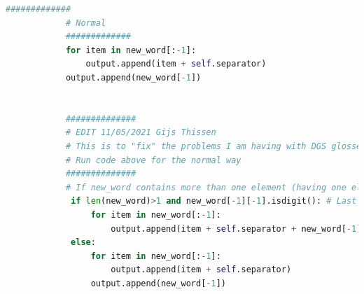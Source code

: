  \label{apx:bpemod}
\begin{lstlisting}[language=Python, caption=Shown is the Python code that is a modification to the normal Byte Pair Encoding algorithm.]
            #############
            # Normal
            #############
            for item in new_word[:-1]:
                output.append(item + self.separator)
            output.append(new_word[-1])


            ##############
            # EDIT 11/05/2021 Gijs Thissen
            # This is to "fix" the problems I am having with DGS glosses with features that get split up
            # Run code above for the normal way
            ##############
            # If new_word contains more than one element (having one element suggest there not being a temporal feature)
             if len(new_word)>1 and new_word[-1][-1].isdigit(): # Last element of last element of new_word is digit
                 for item in new_word[:-1]:
                     output.append(item + self.separator + new_word[-1])
             else:
                 for item in new_word[:-1]:
                     output.append(item + self.separator)
                 output.append(new_word[-1])
\end{lstlisting}